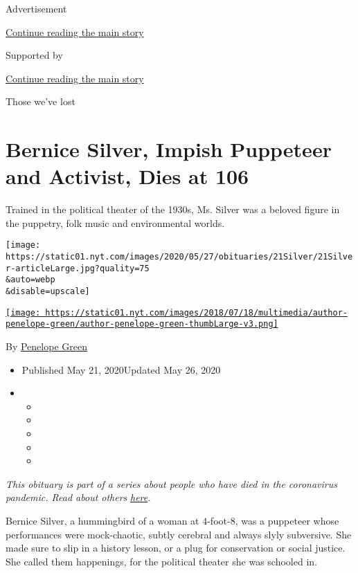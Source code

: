 Advertisement

\protect\hyperlink{after-top}{Continue reading the main story}

Supported by

\protect\hyperlink{after-sponsor}{Continue reading the main story}

Those we've lost

\hypertarget{bernice-silver-impish-puppeteer-and-activist-dies-at-106}{%
\section{Bernice Silver, Impish Puppeteer and Activist, Dies at
106}\label{bernice-silver-impish-puppeteer-and-activist-dies-at-106}}

Trained in the political theater of the 1930s, Ms. Silver was a beloved
figure in the puppetry, folk music and environmental worlds.

\texttt{[image: https://static01.nyt.com/images/2020/05/27/obituaries/21Silver/21Silver-articleLarge.jpg?quality=75\\\&auto=webp\\\&disable=upscale]}

\href{https://www.nytimes.com/by/penelope-green}{\texttt{[image: https://static01.nyt.com/images/2018/07/18/multimedia/author-penelope-green/author-penelope-green-thumbLarge-v3.png]}}

By \href{https://www.nytimes.com/by/penelope-green}{Penelope Green}

\begin{itemize}
\item
  Published May 21, 2020Updated May 26, 2020
\item
  \begin{itemize}
  \item
  \item
  \item
  \item
  \item
  \end{itemize}
\end{itemize}

\emph{This obituary is part of a series about people who have died in
the coronavirus pandemic. Read about others}
\href{https://www.nytimes.com/series/people-who-have-died-of-the-coronavirus}{\emph{here}}\emph{.}

Bernice Silver, a hummingbird of a woman at 4-foot-8, was a puppeteer
whose performances were mock-chaotic, subtly cerebral and always slyly
subversive. She made sure to slip in a history lesson, or a plug for
conservation or social justice. She called them happenings, for the
political theater she was schooled in.

